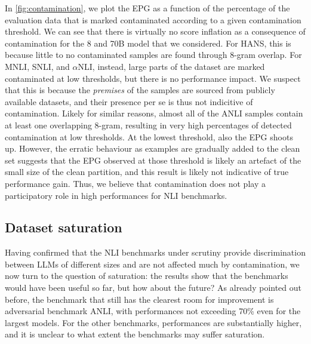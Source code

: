 In \cref{fig:contamination}, we plot the EPG as a function of the percentage of the evaluation data that is marked contaminated according to a given contamination threshold.
We can see that there is virtually no score inflation as a consequence of contamination for the 8 and 70B model that we considered.
For HANS, this is because little to no contaminated samples are found through 8-gram overlap.
For MNLI, SNLI, and $\alpha$NLI, instead, large parts of the dataset are marked contaminated at low thresholds, but there is no performance impact.
We suspect that this is because the \textit{premises} of the samples are sourced from publicly available datasets, and their presence per se is thus not indicitive of contamination.
Likely for similar reasons, almost all of the ANLI samples contain at least one overlapping 8-gram, resulting in very high percentages of detected contamination at low thresholds.
At the lowest threshold, also the EPG shoots up.
However, the erratic behaviour as examples are gradually added to the clean set suggests that the EPG observed at those threshold is likely an artefact of the small size of the clean partition, and this result is likely not indicative of true performance gain.
Thus, we believe that contamination does not play a participatory role in high performances for NLI benchmarks. 

\subsection{Dataset saturation}\label{subsec:saturation}
Having confirmed that the NLI benchmarks under scrutiny provide discrimination between LLMs of different sizes and are not affected much by contamination, we now turn to the question of saturation: the results show that the benchmarks would have been useful so far, but how about the future?
As already pointed out before, the benchmark that still has the clearest room for improvement is adversarial benchmark ANLI, with performances not exceeding 70\% even for the largest models.
For the other benchmarks, performances are substantially higher, and it is unclear to what extent the benchmarks may suffer saturation.

